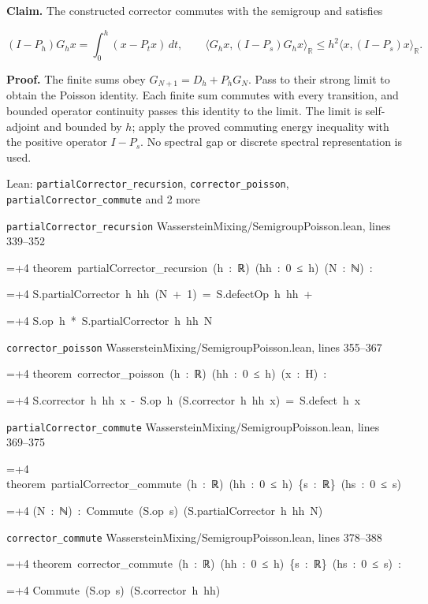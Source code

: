 \documentclass[11pt,a4paper]{report}
\newlength{\leancharwidth}
\newenvironment{leancode}{\par\smallskip\begingroup\ttfamily\footnotesize\raggedright
  \settowidth{\leancharwidth}{M}\setlength{\parskip}{0pt}\setlength{\parindent}{0pt}
  \frenchspacing}{\par\endgroup\smallskip}
\newcommand{\leanline}[2]{\hangindent=\dimexpr#1\leancharwidth+4\leancharwidth\relax
  \hangafter=1\noindent\hspace*{#1\leancharwidth}#2\par}
\newcommand{\leansource}[1]{\par{\footnotesize\color{leanmuted}#1}\par}
\begin{document}
\textbf{Claim.} The constructed corrector commutes with the semigroup and satisfies

\[(I-P_h)G_hx=\int_0^h(x-P_tx)\,dt,\qquad \langle G_hx,(I-P_s)G_hx\rangle_{\mathbb R}\le h^2\langle x,(I-P_s)x\rangle_{\mathbb R}.\]

\textbf{Proof.} The finite sums obey \(G_{N+1}=D_h+P_hG_N\). Pass to their strong limit to obtain the Poisson identity. Each finite sum commutes with every transition, and bounded operator continuity passes this identity to the limit. The limit is self-adjoint and bounded by \(h\); apply the proved commuting energy inequality with the positive operator \(I-P_s\). No spectral gap or discrete spectral representation is used.

\begin{leanbox}{Lean: \texttt{partialCorrector\_\allowbreak{}recursion}, \texttt{corrector\_\allowbreak{}poisson}, \texttt{partialCorrector\_\allowbreak{}commute} and 2 more}
\leansource{\texttt{partialCorrector\_\allowbreak{}recursion} \quad WassersteinMixing/\allowbreak{}SemigroupPoisson.lean, lines 339–352}
\begin{leancode}
\leanline{0}{theorem\ partialCorrector\_recursion\ (h\ :\ ℝ)\ (hh\ :\ 0\ ≤\ h)\ (N\ :\ ℕ)\ :}
\leanline{4}{S.partialCorrector\ h\ hh\ (N\ +\ 1)\ =\ S.defectOp\ h\ hh\ +}
\leanline{6}{S.op\ h\ *\ S.partialCorrector\ h\ hh\ N}
\end{leancode}
\leansource{\texttt{corrector\_\allowbreak{}poisson} \quad WassersteinMixing/\allowbreak{}SemigroupPoisson.lean, lines 355–367}
\begin{leancode}
\leanline{0}{theorem\ corrector\_poisson\ (h\ :\ ℝ)\ (hh\ :\ 0\ ≤\ h)\ (x\ :\ H)\ :}
\leanline{4}{S.corrector\ h\ hh\ x\ -\ S.op\ h\ (S.corrector\ h\ hh\ x)\ =\ S.defect\ h\ x}
\end{leancode}
\leansource{\texttt{partialCorrector\_\allowbreak{}commute} \quad WassersteinMixing/\allowbreak{}SemigroupPoisson.lean, lines 369–375}
\begin{leancode}
\leanline{0}{theorem\ partialCorrector\_commute\ (h\ :\ ℝ)\ (hh\ :\ 0\ ≤\ h)\ \{s\ :\ ℝ\}\ (hs\ :\ 0\ ≤\ s)}
\leanline{4}{(N\ :\ ℕ)\ :\ Commute\ (S.op\ s)\ (S.partialCorrector\ h\ hh\ N)}
\end{leancode}
\leansource{\texttt{corrector\_\allowbreak{}commute} \quad WassersteinMixing/\allowbreak{}SemigroupPoisson.lean, lines 378–388}
\begin{leancode}
\leanline{0}{theorem\ corrector\_commute\ (h\ :\ ℝ)\ (hh\ :\ 0\ ≤\ h)\ \{s\ :\ ℝ\}\ (hs\ :\ 0\ ≤\ s)\ :}
\leanline{4}{Commute\ (S.op\ s)\ (S.corrector\ h\ hh)}

\end{leancode}
\end{leanbox}
\end{document}
